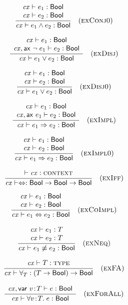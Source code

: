 \begin{theorem}\label{thm-econjO}
{\rm
\[
\frac{\begin{array}{c}\mathit{cx}\vdash e_1:\mathsf{Bool}\\\mathit{cx}\vdash e_2:\mathsf{Bool}\end{array}}{\mathit{cx}\vdash e_1\wedge e_2:\mathsf{Bool}}\quad\mbox{(\textsc{exConj0})}
\]
}
\end{theorem}

\begin{theorem}\label{thm-edisj}
{\rm
\[
\frac{\begin{array}{c}\mathit{cx}\vdash e_1:\mathsf{Bool}\\\mathit{cx},\mathsf{ax}\ \neg\;e_1\vdash e_2:\mathsf{Bool}\end{array}}{\mathit{cx}\vdash e_1\vee e_2:\mathsf{Bool}}\quad\mbox{(\textsc{exDisj})}
\]
}
\end{theorem}

\begin{theorem}\label{thm-edisjO}
{\rm
\[
\frac{\begin{array}{c}\mathit{cx}\vdash e_1:\mathsf{Bool}\\\mathit{cx}\vdash e_2:\mathsf{Bool}\end{array}}{\mathit{cx}\vdash e_1\vee e_2:\mathsf{Bool}}\quad\mbox{(\textsc{exDisj0})}
\]
}
\end{theorem}

\begin{theorem}\label{thm-eimpl}
{\rm
\[
\frac{\begin{array}{c}\mathit{cx}\vdash e_1:\mathsf{Bool}\\\mathit{cx},\mathsf{ax}\ e_1\vdash e_2:\mathsf{Bool}\end{array}}{\mathit{cx}\vdash e_1\Rightarrow e_2:\mathsf{Bool}}\quad\mbox{(\textsc{exImpl})}
\]
}
\end{theorem}

\begin{theorem}\label{thm-eimplO}
{\rm
\[
\frac{\begin{array}{c}\mathit{cx}\vdash e_1:\mathsf{Bool}\\\mathit{cx}\vdash e_2:\mathsf{Bool}\end{array}}{\mathit{cx}\vdash e_1\Rightarrow e_2:\mathsf{Bool}}\quad\mbox{(\textsc{exImpl0})}
\]
}
\end{theorem}

\begin{theorem}\label{thm-eiff}
{\rm
\[
\frac{\begin{array}{c}\vdash\mathit{cx}:\textsc{context}\end{array}}{\mathit{cx}\vdash\Leftrightarrow:\mathsf{Bool}\to\mathsf{Bool}\to\mathsf{Bool}}\quad\mbox{(\textsc{exIff})}
\]
}
\end{theorem}

\begin{theorem}\label{thm-ecoimpl}
{\rm
\[
\frac{\begin{array}{c}\mathit{cx}\vdash e_1:\mathsf{Bool}\\\mathit{cx}\vdash e_2:\mathsf{Bool}\end{array}}{\mathit{cx}\vdash e_1\Leftrightarrow e_2:\mathsf{Bool}}\quad\mbox{(\textsc{exCoImpl})}
\]
}
\end{theorem}

\begin{theorem}\label{thm-eneq}
{\rm
\[
\frac{\begin{array}{c}\mathit{cx}\vdash e_1:T\\\mathit{cx}\vdash e_2:T\end{array}}{\mathit{cx}\vdash e_1\not\equiv e_2:\mathsf{Bool}}\quad\mbox{(\textsc{exNeq})}
\]
}
\end{theorem}

\begin{theorem}\label{thm-efaop}
{\rm
\[
\frac{\begin{array}{c}\mathit{cx}\vdash T:\textsc{type}\end{array}}{\mathit{cx}\vdash\forall_{T}:(T\to\mathsf{Bool})\to\mathsf{Bool}}\quad\mbox{(\textsc{exFA})}
\]
}
\end{theorem}

\begin{theorem}\label{thm-efa}
{\rm
\[
\frac{\begin{array}{c}\mathit{cx},\mathsf{var}\ v\!:\!T\vdash e:\mathsf{Bool}\end{array}}{\mathit{cx}\vdash\forall v\!:\!T.\;e:\mathsf{Bool}}\quad\mbox{(\textsc{exForAll})}
\]
}
\end{theorem}


